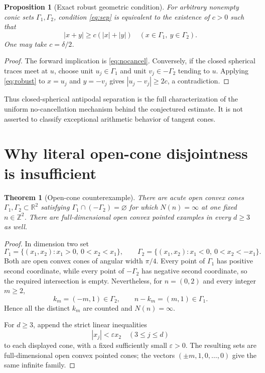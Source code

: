 \documentclass[11pt]{article}
\newtheorem{theorem}{Theorem}
\newtheorem{proposition}{Proposition}
\newcommand{\R}{\mathbb R}
\newcommand{\Z}{\mathbb Z}
\begin{document}
\begin{proposition}[Exact robust geometric condition]\label{prop:robust}
For arbitrary nonempty conic sets $\Gamma_1,\Gamma_2$, condition
\eqref{eq:sep} is equivalent to the existence of $c>0$ such that
\begin{equation}\label{eq:robust}
 |x+y|\ge c(|x|+|y|)
 \quad(x\in\Gamma_1,\ y\in\Gamma_2).
\end{equation}
One may take $c=\delta/2$.
\end{proposition}

\begin{proof}
The forward implication is \eqref{eq:nocancel}.  Conversely, if the closed
spherical traces meet at $u$, choose unit $u_j\in\Gamma_1$ and unit
$v_j\in-\Gamma_2$ tending to $u$.  Applying \eqref{eq:robust} to
$x=u_j$ and $y=-v_j$ gives $|u_j-v_j|\ge2c$, a contradiction.
\end{proof}

Thus closed-spherical antipodal separation is the full characterization of
the uniform no-cancellation mechanism behind the conjectured estimate.  It is
not asserted to classify exceptional arithmetic behavior of tangent cones.

\section{Why literal open-cone disjointness is insufficient}

\begin{theorem}[Open-cone counterexample]\label{thm:counter}
There are acute open convex cones $\Gamma_1,\Gamma_2\subset\R^2$ satisfying
$\Gamma_1\cap(-\Gamma_2)=\varnothing$ for which $N(n)=\infty$ at one fixed
$n\in\Z^2$.  There are full-dimensional open convex pointed examples in
every $d\ge3$ as well.
\end{theorem}

\begin{proof}
In dimension two set
\[
 \Gamma_1=\{(x_1,x_2):x_1>0,\ 0<x_2<x_1\},\qquad
 \Gamma_2=\{(x_1,x_2):x_1<0,\ 0<x_2<-x_1\}.
\]
Both are open convex cones of angular width $\pi/4$.  Every point of
$\Gamma_1$ has positive second coordinate, while every point of
$-\Gamma_2$ has negative second coordinate, so the required intersection is
empty.  Nevertheless, for $n=(0,2)$ and every integer $m\ge2$,
\[
 k_m=(-m,1)\in\Gamma_2,\qquad n-k_m=(m,1)\in\Gamma_1.
\]
Hence all the distinct $k_m$ are counted and $N(n)=\infty$.

For $d\ge3$, append the strict linear inequalities
\[
 |x_j|<\varepsilon x_2\quad(3\le j\le d)
\]
to each displayed cone, with a fixed sufficiently small $\varepsilon>0$.
The resulting sets are full-dimensional open convex pointed cones; the
vectors $(\pm m,1,0,\ldots,0)$ give the same infinite family.
\end{proof}
\end{document}

